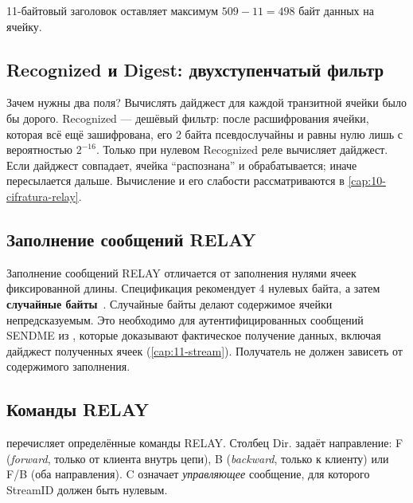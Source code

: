 11-байтовый заголовок оставляет максимум $509 - 11 = 498$ байт данных на ячейку.

\subsection{Recognized и Digest: двухступенчатый фильтр}

Зачем нужны два поля? Вычислять дайджест для каждой транзитной ячейки было бы дорого. Recognized --- дешёвый фильтр: после расшифрования ячейки, которая всё ещё зашифрована, его 2 байта псевдослучайны и равны нулю лишь с вероятностью $2^{-16}$. Только при нулевом Recognized реле вычисляет дайджест. Если дайджест совпадает, ячейка \enquote{распознана} и обрабатывается; иначе пересылается дальше. Вычисление и его слабости рассматриваются в \cref{cap:10-cifratura-relay}.

\subsection{Заполнение сообщений RELAY}

Заполнение сообщений RELAY отличается от заполнения нулями ячеек фиксированной длины. Спецификация рекомендует 4 нулевых байта, а затем \textbf{случайные байты}~. Случайные байты делают содержимое ячейки непредсказуемым. Это необходимо для аутентифицированных сообщений SENDME из , которые доказывают фактическое получение данных, включая дайджест полученных ячеек (\cref{cap:11-stream}). Получатель не должен зависеть от содержимого заполнения.

\subsection{Команды RELAY}

 перечисляет определённые команды RELAY. Столбец Dir. задаёт направление: F (\emph{forward}, только от клиента внутрь цепи), B (\emph{backward}, только к клиенту) или F/B (оба направления). C означает \emph{управляющее} сообщение, для которого StreamID должен быть нулевым.

